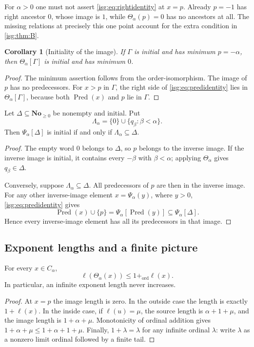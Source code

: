 \documentclass[11pt]{article}
\newtheorem{corollary}[corollary]{Corollary}
\theoremstyle{definition}
\theoremstyle{remark}
\newcommand{\No}{\ensuremath{\mathbf{No}}}
\newcommand{\Pred}{\operatorname{Pred}}
\newcommand{\len}{\ell}
\newcommand{\tht}{\Theta_{\alpha}}
\newcommand{\psiA}{\Psi_{\alpha}}
\begin{document}
\begin{remark}\label{isg:rem:exception}
For $\alpha>0$ one must not assert \eqref{isg:eq:rightidentity} at $x=p$.
Already $p=-1$ has right ancestor $0$, whose image is $1$, while
$\tht(p)=0$ has no ancestors at all. The missing relations at precisely
this one point account for the extra condition in \cref{isg:thm:B}.
\end{remark}

\begin{corollary}[Initiality of the image]\label{isg:cor:initialimage}
If $\Gamma$ is initial and has minimum $p=-\alpha$, then
$\tht[\Gamma]$ is initial and has minimum $0$.
\end{corollary}
\begin{proof}
The minimum assertion follows from the order-isomorphism. The image of
$p$ has no predecessors. For $x>p$ in $\Gamma$, the right side of
\eqref{isg:eq:predidentity} lies in $\tht[\Gamma]$, because both
$\Pred(x)$ and $p$ lie in $\Gamma$.
\end{proof}

\begin{proposition}\label{isg:prop:inversetree}
Let $\Delta\subseteq\No_{\ge0}$ be nonempty and initial. Put
\[
 \Lambda_\alpha=\{0\}\cup\{q_\beta:\beta<\alpha\}.
\]
Then $\psiA[\Delta]$ is initial if and only if
$\Lambda_\alpha\subseteq\Delta$.
\end{proposition}
\begin{proof}
The empty word $0$ belongs to $\Delta$, so $p$ belongs to the inverse
image. If the inverse image is initial, it contains every $-\beta$ with
$\beta<\alpha$; applying $\tht$ gives $q_\beta\in\Delta$.

Conversely, suppose $\Lambda_\alpha\subseteq\Delta$. All predecessors
of $p$ are then in the inverse image. For any other inverse-image element
$x=\psiA(y)$, where $y>0$, \eqref{isg:eq:predidentity} gives
\[
 \Pred(x)\cup\{p\}=\psiA[\Pred(y)]\subseteq\psiA[\Delta].
\]
Hence every inverse-image element has all its predecessors in that image.
\end{proof}

\subsection{Exponent lengths and a finite picture}
\begin{proposition}\label{isg:prop:length}
For every $x\in C_\alpha$,
\[
 \len(\tht(x))\le 1+_{\mathrm{ord}}\len(x).
\]
In particular, an infinite exponent length never increases.
\end{proposition}
\begin{proof}
At $x=p$ the image length is zero. In the outside case the length is
exactly $1+\len(x)$. In the inside case, if $\len(u)=\mu$, the source
length is $\alpha+1+\mu$, and the image length is $1+\alpha+\mu$.
Monotonicity of ordinal addition gives
$1+\alpha+\mu\le1+\alpha+1+\mu$. Finally, $1+\lambda=\lambda$ for
any infinite ordinal $\lambda$: write $\lambda$ as a nonzero limit
ordinal followed by a finite tail.
\end{proof}
\end{document}
